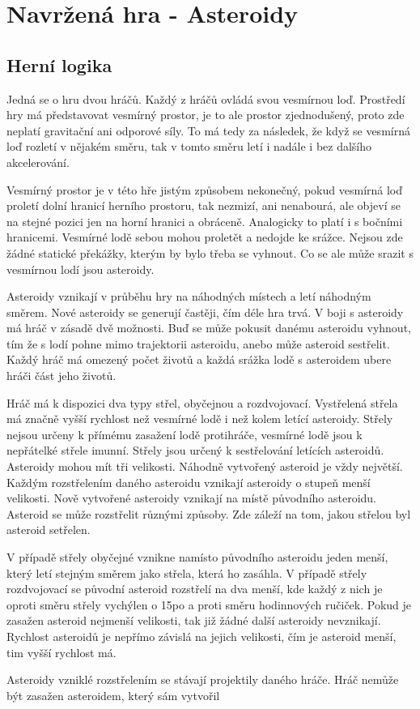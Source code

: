 \chapter{Navržená hra - Asteroidy}

\section{Herní logika}
Jedná se o hru dvou hráčů. 
Každý z hráčů ovládá svou vesmírnou loď.
Prostředí hry má představovat vesmírný prostor, je to ale prostor zjednodušený, proto zde neplatí gravitační ani odporové síly.
To má tedy za následek, že když se vesmírná loď rozletí v nějakém směru, tak v tomto směru letí i nadále i bez dalšího akcelerování.
\par
\label{HraniceProsotru}
Vesmírný prostor je v této hře jistým způsobem nekonečný, pokud vesmírná loď proletí dolní hranicí herního prostoru, tak nezmizí, ani nenabourá, ale objeví se na stejné pozici jen na horní hranici a obráceně. Analogicky to platí i s bočními hranicemi.
Vesmírné lodě sebou mohou proletět a nedojde ke srážce.
Nejsou zde žádné statické překážky, kterým by bylo třeba se vyhnout. Co se ale může srazit s vesmírnou lodí jsou asteroidy.    
\par
Asteroidy vznikají v průběhu hry na náhodných místech a letí náhodným směrem. Nové asteroidy se generují častěji, čím déle hra trvá.
V boji s asteroidy má hráč v zásadě dvě možnosti. Buď se může pokusit danému asteroidu vyhnout, tím že s lodí pohne mimo trajektorii asteroidu, anebo může asteroid sestřelit.
Každý hráč má omezený počet životů a každá srážka lodě s asteroidem ubere hráči část jeho životů.
\par
Hráč má k dispozici dva typy střel, obyčejnou a rozdvojovací. Vystřelená střela má značně vyšší rychlost než vesmírné lodě i než kolem letící asteroidy.
Střely nejsou určeny k přímému zasažení lodě protihráče, vesmírné lodě jsou k nepřátelké střele imunní.
Střely jsou určený k sestřelování letících asteroidů. Asteroidy mohou mít tři velikosti. Náhodně vytvořený asteroid je vždy největší. Každým rozstřelením daného asteroidu vznikají asteroidy o stupeň menší velikosti.
Nově vytvořené asteroidy vznikají na místě původního asteroidu. Asteroid se může rozstřelit různými způsoby. Zde záleží na tom, jakou střelou byl asteroid setřelen. 
\par
V případě střely obyčejné vznikne namísto původního asteroidu jeden menší, který letí stejným směrem jako střela, která ho zasáhla.
V případě střely rozdvojovací se původní asteroid rozstřelí na dva menší, kde každý z nich je oproti směru střely vychýlen o 15\textdegree po a proti směru hodinnových ručiček.
Pokud je zasažen asteroid nejmenší velikosti, tak již žádné další asteroidy nevznikají. 
Rychlost asteroidů je nepřímo závislá na jejich velikosti, čím je asteroid menší, tim vyšší rychlost má.
\par
Asteroidy vzniklé rozstřelením se stávají projektily daného hráče. Hráč nemůže být zasažen asteroidem, který sám vytvořil

